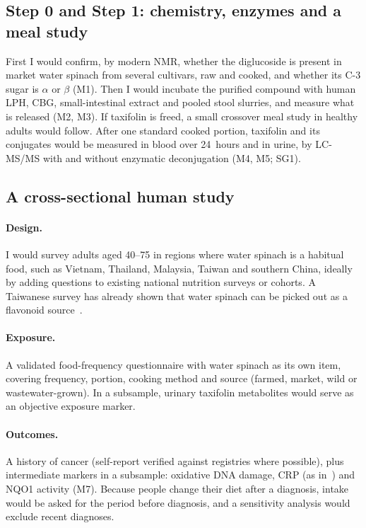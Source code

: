 \documentclass[11pt,a4paper]{article}
\begin{document}
\subsection{Step 0 and Step 1: chemistry, enzymes and a meal study}
\label{sec:pk}

First I would confirm, by modern NMR, whether the diglucoside is present in market water spinach from several cultivars, raw and cooked, and whether its C-3 sugar is $\alpha$ or $\beta$ (M1). Then I would incubate the purified compound with human LPH, CBG, small-intestinal extract and pooled stool slurries, and measure what is released (M2, M3). If taxifolin is freed, a small crossover meal study in healthy adults would follow. After one standard cooked portion, taxifolin and its conjugates would be measured in blood over 24~hours and in urine, by LC-MS/MS with and without enzymatic deconjugation (M4, M5; SG1).

\subsection{A cross-sectional human study}
\label{sec:cross}

\paragraph{Design.} I would survey adults aged 40--75 in regions where water spinach is a habitual food, such as Vietnam, Thailand, Malaysia, Taiwan and southern China, ideally by adding questions to existing national nutrition surveys or cohorts. A Taiwanese survey has already shown that water spinach can be picked out as a flavonoid source~\cite{hsieh2021}.

\paragraph{Exposure.} A validated food-frequency questionnaire with water spinach as its own item, covering frequency, portion, cooking method and source (farmed, market, wild or wastewater-grown). In a subsample, urinary taxifolin metabolites would serve as an objective exposure marker.

\paragraph{Outcomes.} A history of cancer (self-report verified against registries where possible), plus intermediate markers in a subsample: oxidative DNA damage, CRP (as in~\cite{hsieh2021}) and NQO1 activity (M7). Because people change their diet after a diagnosis, intake would be asked for the period before diagnosis, and a sensitivity analysis would exclude recent diagnoses.
\end{document}
